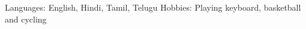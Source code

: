 \begin{cvskills}
  \cvskill
    {Languages:}
    {English, Hindi, Tamil, Telugu}
  \cvskill
    {Hobbies:}
    {Playing keyboard, basketball and cycling}
\end{cvskills}